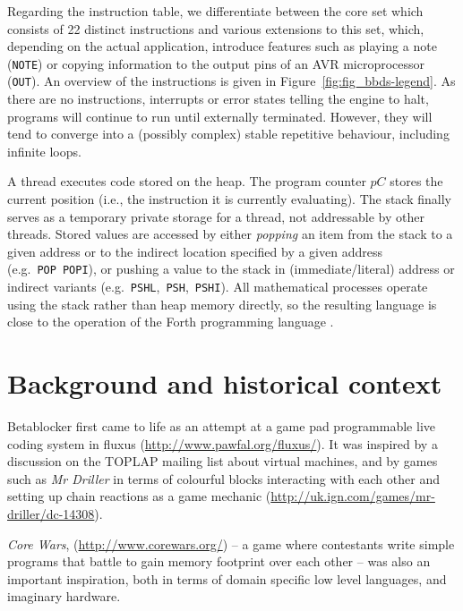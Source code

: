 \documentclass[letterpaper, 12pt]{article}
\begin{document}
Regarding the instruction table, we differentiate between the core set which consists of 22 distinct instructions and various extensions to this set, which, depending on the actual application, introduce features such as playing a note (\texttt{NOTE}) or copying information to the output pins of an AVR microprocessor (\texttt{OUT}).
An overview of the instructions is given in Figure~\ref{fig:fig_bbds-legend}.
As there are no instructions, interrupts or error states telling the engine to halt, programs will continue to run until externally terminated.
However, they will tend to converge into a (possibly complex) stable repetitive behaviour, including infinite loops.

A thread executes code stored on the heap.
The program counter $pC$ stores the current position (i.e., the instruction it is currently evaluating).
The stack finally serves as a temporary private storage for a thread, not addressable by other threads.
Stored values are accessed by either \emph{popping} an item from the stack to a given address or to the indirect location specified by a given address (e.g.~\texttt{POP}~\texttt{POPI}), or pushing a value to the stack in (immediate/literal) address or indirect variants  (e.g.~\texttt{PSHL},~\texttt{PSH},~\texttt{PSHI}). All mathematical processes operate using the stack rather than heap memory directly, so the resulting language is close to the operation of the Forth programming language \citep{rather1993-the}.
\parskip 18pt

\section{Background and historical context}
\label{sec:background}


Betablocker first came to life as an attempt at a game pad programmable live coding system in fluxus (\url{http://www.pawfal.org/fluxus/}).
It was inspired by a discussion on the TOPLAP mailing list about virtual machines, and by games such as \emph{Mr Driller} in terms of colourful blocks interacting with each other and setting up chain reactions as a game mechanic (\url{http://uk.ign.com/games/mr-driller/dc-14308}).

\emph{Core Wars}, (\url{http://www.corewars.org/}) -- a game where contestants write simple programs that battle to gain memory footprint over each other -- was also an important inspiration, both in terms of domain specific low level languages, and imaginary hardware.
\end{document}
